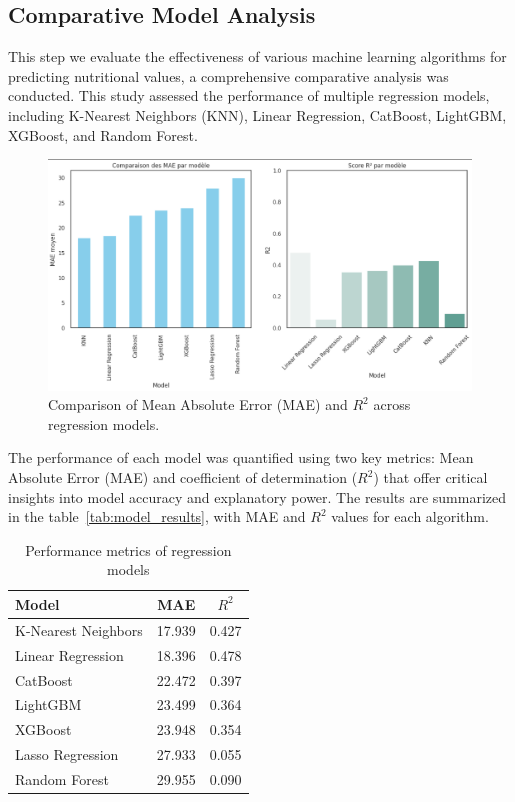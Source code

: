 \subsection{Comparative Model Analysis}
\par This step we evaluate the effectiveness of various machine learning algorithms for predicting nutritional values, a comprehensive comparative analysis was conducted. This study assessed the performance of multiple regression models, including K-Nearest Neighbors (KNN), Linear Regression, CatBoost, LightGBM, XGBoost, and Random Forest.
\begin{figure}[H]
    \centering
    \includegraphics[width=0.98\linewidth]{images/mae_r2_comparison.png}
    \caption{Comparison of Mean Absolute Error (MAE) and \(R^2\) across regression models.}
    \label{fig:model_comparison}
\end{figure}

The performance of each model was quantified using two key metrics: Mean Absolute Error (MAE) and coefficient of determination ($R^2$) that offer critical insights into model accuracy and explanatory power. The results are summarized in the table~\ref{tab:model_results}, with MAE and \(R^2\) values for each algorithm.

\begin{table}[H]
    \centering
    \caption{Performance metrics of regression models}
    \begin{tabular}{lcc}
        \toprule
        \textbf{Model} & \textbf{MAE} & \textbf{\(R^2\)} \\
        \midrule
        K-Nearest Neighbors & 17.939 & 0.427 \\
        Linear Regression & 18.396 & 0.478 \\
        CatBoost & 22.472 & 0.397 \\
        LightGBM & 23.499 & 0.364 \\
        XGBoost & 23.948 & 0.354 \\
        Lasso Regression &  27.933 & 0.055 \\
        Random Forest & 29.955 & 0.090 \\
        \bottomrule
    \end{tabular}
\end{table}

